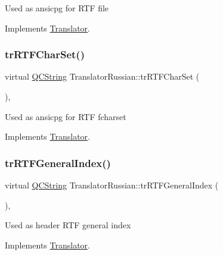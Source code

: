Used as ansicpg for R\+TF file 

Implements \mbox{\hyperlink{class_translator_a9953a4c0e6a4fc7d017abcd5c2939e0f}{Translator}}.

\mbox{\label{class_translator_russian_aa439d190ee58e9b8e2d1b15548bb90a2}} 
\subsubsection{\texorpdfstring{trRTFCharSet()}{trRTFCharSet()}}
{\footnotesize\ttfamily virtual \mbox{\hyperlink{class_q_c_string}{Q\+C\+String}} Translator\+Russian\+::tr\+R\+T\+F\+Char\+Set (\begin{DoxyParamCaption}{ }\end{DoxyParamCaption})\hspace{0.3cm}{\ttfamily [inline]}, {\ttfamily [virtual]}}

Used as ansicpg for R\+TF fcharset 

Implements \mbox{\hyperlink{class_translator_afad391f3cbfb5ce6332b7239f8e2049a}{Translator}}.

\mbox{\label{class_translator_russian_ac65fb8af34758e9cf9fdfc8a9d1ee8d5}} 
\subsubsection{\texorpdfstring{trRTFGeneralIndex()}{trRTFGeneralIndex()}}
{\footnotesize\ttfamily virtual \mbox{\hyperlink{class_q_c_string}{Q\+C\+String}} Translator\+Russian\+::tr\+R\+T\+F\+General\+Index (\begin{DoxyParamCaption}{ }\end{DoxyParamCaption})\hspace{0.3cm}{\ttfamily [inline]}, {\ttfamily [virtual]}}

Used as header R\+TF general index 

Implements \mbox{\hyperlink{class_translator}{Translator}}.

\mbox{\label{class_translator_russian_a005cfbfa26107858c7820e33b1a5b6e3}} 
